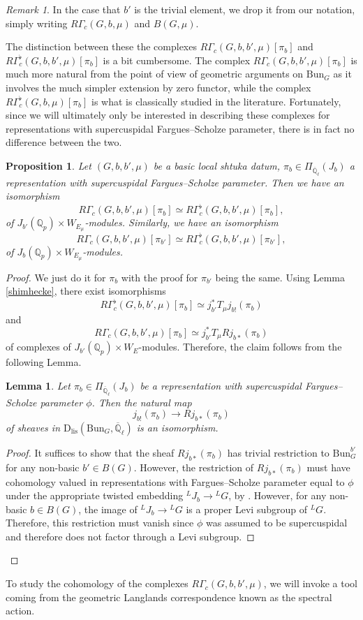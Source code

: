 \documentclass[reqno,11pt]{amsart}
\newtheorem{lemma}[theorem]{Lemma}
\newtheorem{proposition}[theorem]{Proposition}
\theoremstyle{remark}
\newtheorem{remark}[theorem]{Remark}
\newcommand{\Q}{\mathbb{Q}}
\newcommand{\LL}{{}^L}
\newcommand{\ov}{\overline}
\newcommand{\Bun}{\mathrm{Bun}}
\newcommand{\Dlis}{\mathrm{D}_{\mathrm{lis}}}
\begin{document}
\begin{remark}
In the case that $b'$ is the trivial element, we drop it from our notation, simply writing $R\Gamma_{c}(G,b,\mu)$ and $B(G,\mu)$. 
\end{remark}
The distinction between these the complexes $R\Gamma_{c}(G,b,b',\mu)[\pi_{b}]$ and $R\Gamma^{\flat}_{c}(G,b,b',\mu)[\pi_{b}]$ is a bit cumbersome. The complex $R\Gamma_{c}(G,b,b',\mu)[\pi_{b}]$ is much more natural from the point of view of geometric arguments on $\Bun_{G}$ as it involves the much simpler extension by zero functor, while the complex $R\Gamma^{\flat}_{c}(G,b,\mu)[\pi_{b}]$ is what is classically studied in the literature. Fortunately, since we will ultimately only be interested in describing these complexes for representations with supercuspidal Fargues--Scholze parameter, there is in fact no difference between the two. 
\begin{proposition}{\label{flatnatural}}
Let $(G,b,b',\mu)$ be a basic local shtuka datum, $\pi_{b} \in \Pi_{\ov{\Q}_{\ell}}(J_{b})$ a representation with supercuspidal Fargues--Scholze parameter. Then we have an isomorphism
\[ R\Gamma_{c}(G,b,b',\mu)[\pi_{b}] \simeq R\Gamma^{\flat}_{c}(G,b,b',\mu)[\pi_{b}], \]
of $J_{b'}(\mathbb{Q}_{p}) \times W_{E_{\mu}}$-modules. Similarly, we have an isomorphism  
\[ R\Gamma_{c}(G,b,b',\mu)[\pi_{b'}] \simeq R\Gamma^{\flat}_{c}(G,b,b',\mu)[\pi_{b'}], \]
of $J_{b}(\mathbb{Q}_{p}) \times W_{E_{\mu}}$-modules. 
\end{proposition}
\begin{proof}
We just do it for $\pi_{b}$ with the proof for $\pi_{b'}$ being the same. Using Lemma \ref{shimhecke}, there exist isomorphisms
\[ R\Gamma^{\flat}_{c}(G,b,b',\mu)[\pi_{b}] \simeq j_{b'}^{*}T_{\mu}j_{b!}(\pi_{b})\]
and
\[ R\Gamma_{c}(G,b,b',\mu)[\pi_{b}] \simeq j_{b'}^{*}T_{\mu}Rj_{b*}(\pi_{b}) \]
of complexes of $J_{b'}(\mathbb{Q}_{p}) \times W_{E}$-modules. Therefore, the claim follows from the following Lemma.
\begin{lemma} Let $\pi_{b} \in \Pi_{\ov{\Q}_{\ell}}(J_{b})$ be a representation with supercuspidal Fargues--Scholze parameter $\phi$. Then the natural map 
\[ j_{b!}(\pi_{b}) \rightarrow Rj_{b*}(\pi_{b}) \]
of sheaves in $\Dlis(\Bun_{G},\overline{\mathbb{Q}}_{\ell})$ is an isomorphism. 
\end{lemma}
\begin{proof}
It suffices to show that the sheaf $Rj_{b*}(\pi_{b})$ has trivial restriction to $\Bun_{G}^{b'}$ for any non-basic $b' \in B(G)$. However, the restriction of $Rj_{b*}(\pi_{b})$ must have cohomology valued in representations with Fargues--Scholze parameter equal to $\phi$ under the appropriate twisted embedding $\phantom{}^LJ_{b} \rightarrow \phantom{}^{L}G$, by \cite[Section~IX.7.1]{FS}. However, for any non-basic $b \in B(G)$, the image of $\phantom{}^LJ_{b} \to \LL G$ is a proper Levi subgroup of $\phantom{}^{L}G$. Therefore, this restriction must vanish since $\phi$ was assumed to be supercuspidal and therefore does not factor through a Levi subgroup. 
\end{proof}
\end{proof}
To study the cohomology of the complexes $R\Gamma_{c}(G,b,b',\mu)$, we will invoke a tool coming from the geometric Langlands correspondence known as the spectral action.
\end{document}
